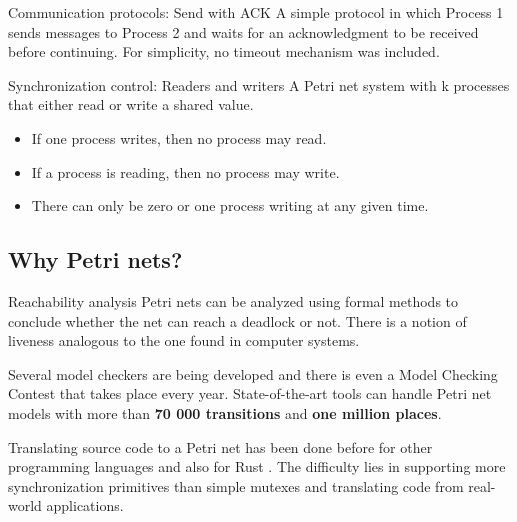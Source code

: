 \documentclass{beamer}
\begin{document}
\begin{frame}{Communication protocols: Send with ACK}
  \scriptsize
  A simple protocol in which Process 1 sends messages to Process 2 and
  waits for an acknowledgment to be received before continuing.
  For simplicity, no timeout mechanism was included.

  \begin{figure}
    \centering
    
  \end{figure}
\end{frame}

\begin{frame}{Synchronization control: Readers and writers}
  \scriptsize
  A Petri net system with k processes that either read or write a shared value.

  \begin{itemize}
    \item If one process writes, then no process may read.
    \item If a process is reading, then no process may write.
    \item There can only be zero or one process writing at any given time.
  \end{itemize}

  \begin{figure}
    \centering
    
  \end{figure}
\end{frame}

\subsection{Why Petri nets?}

\begin{frame}{Reachability analysis}
  Petri nets can be analyzed using formal methods to conclude whether the net can reach
  a deadlock or not. There is a notion of liveness analogous to the one found in computer systems.

  \vfill
  \pause

  Several model checkers are being developed and
  there is even a Model Checking Contest that takes place every year.
  State-of-the-art tools can handle Petri net models
  with more than \textbf{70 000 transitions} and \textbf{one million places}.

  \vfill
  \pause

  Translating source code to a Petri net has been done before for other programming languages
  \cite{kavi2002modeling,moshtaghi2001} and also for Rust \cite{meyer2020, zhang2022deadlocks}.
  The difficulty lies in supporting more synchronization primitives
  than simple mutexes and translating code from real-world applications.
\end{frame}
\end{document}
